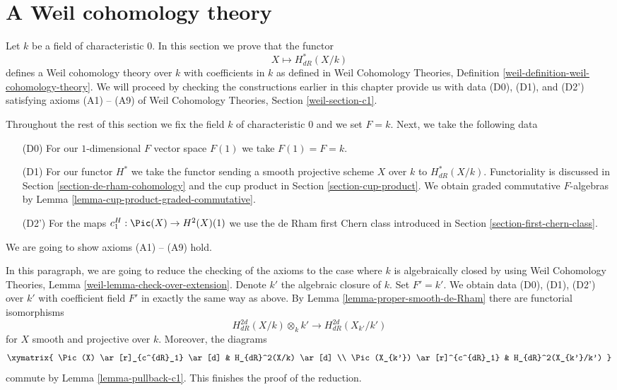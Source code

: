 \section{A Weil cohomology theory}
\label{section-weil}

\noindent
Let $k$ be a field of characteristic $0$. In this section we prove that
the functor
$$
X \longmapsto H^*_{dR}(X/k)
$$
defines a Weil cohomology theory over $k$ with coefficients in $k$ as defined
in Weil Cohomology Theories, Definition
\ref{weil-definition-weil-cohomology-theory}.
We will proceed by checking the constructions earlier in this
chapter provide us with data (D0), (D1), and (D2') satisfying
axioms (A1) -- (A9) of
Weil Cohomology Theories, Section \ref{weil-section-c1}.

\medskip\noindent
Throughout the rest of this section we fix the field $k$ of characteristic
$0$ and we set $F = k$. Next, we take the following data
\begin{enumerate}
\item[(D0)] For our $1$-dimensional $F$ vector space $F(1)$ we take
$F(1) = F = k$.
\item[(D1)] For our functor $H^*$ we take the functor sending
a smooth projective scheme $X$ over $k$ to $H^*_{dR}(X/k)$.
Functoriality is discussed in Section \ref{section-de-rham-cohomology}
and the cup product in Section \ref{section-cup-product}.
We obtain graded commutative $F$-algebras by
Lemma \ref{lemma-cup-product-graded-commutative}.
\item[(D2')] For the maps $c_1^H : \Pic(X) \to H^2(X)(1)$ we
use the de Rham first Chern class introduced in
Section \ref{section-first-chern-class}.
\end{enumerate}
We are going to show axioms (A1) -- (A9) hold.

\medskip\noindent
In this paragraph, we are going to reduce the checking of the
axioms to the case where $k$ is algebraically closed by
using Weil Cohomology Theories, Lemma \ref{weil-lemma-check-over-extension}.
Denote $k'$ the algebraic closure of $k$.
Set $F' = k'$. We obtain data (D0), (D1), (D2') over $k'$ with
coefficient field $F'$ in exactly the same way as above.
By Lemma \ref{lemma-proper-smooth-de-Rham} there are
functorial isomorphisms
$$
H_{dR}^{2d}(X/k) \otimes_k k'
\longrightarrow
H_{dR}^{2d}(X_{k'}/k')
$$
for $X$ smooth and projective over $k$. Moreover, the diagrams
$$
\xymatrix{
\Pic(X) \ar[r]_{c^{dR}_1} \ar[d] & H_{dR}^2(X/k) \ar[d] \\
\Pic(X_{k'}) \ar[r]^{c^{dR}_1} & H_{dR}^2(X_{k'}/k')
}
$$
commute by Lemma \ref{lemma-pullback-c1}.
This finishes the proof of the reduction.

